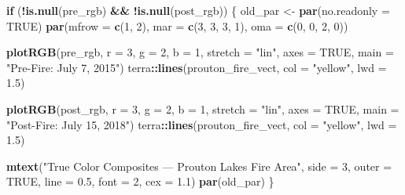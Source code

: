 \documentclass[
]{article}
\newenvironment{Shaded}{\begin{snugshade}}{\end{snugshade}}
\newcommand{\AttributeTok}[1]{\textcolor[rgb]{0.13,0.29,0.53}{#1}}
\newcommand{\ConstantTok}[1]{\textcolor[rgb]{0.56,0.35,0.01}{#1}}
\newcommand{\ControlFlowTok}[1]{\textcolor[rgb]{0.13,0.29,0.53}{\textbf{#1}}}
\newcommand{\DecValTok}[1]{\textcolor[rgb]{0.00,0.00,0.81}{#1}}
\newcommand{\FloatTok}[1]{\textcolor[rgb]{0.00,0.00,0.81}{#1}}
\newcommand{\FunctionTok}[1]{\textcolor[rgb]{0.13,0.29,0.53}{\textbf{#1}}}
\newcommand{\NormalTok}[1]{#1}
\newcommand{\OtherTok}[1]{\textcolor[rgb]{0.56,0.35,0.01}{#1}}
\newcommand{\SpecialCharTok}[1]{\textcolor[rgb]{0.81,0.36,0.00}{\textbf{#1}}}
\newcommand{\StringTok}[1]{\textcolor[rgb]{0.31,0.60,0.02}{#1}}
\begin{document}
\begin{Shaded}
\begin{Highlighting}[]
\ControlFlowTok{if}\NormalTok{ (}\SpecialCharTok{!}\FunctionTok{is.null}\NormalTok{(pre\_rgb) }\SpecialCharTok{\&\&} \SpecialCharTok{!}\FunctionTok{is.null}\NormalTok{(post\_rgb)) \{}
\NormalTok{  old\_par }\OtherTok{\textless{}{-}} \FunctionTok{par}\NormalTok{(}\AttributeTok{no.readonly =} \ConstantTok{TRUE}\NormalTok{)}
  \FunctionTok{par}\NormalTok{(}\AttributeTok{mfrow =} \FunctionTok{c}\NormalTok{(}\DecValTok{1}\NormalTok{, }\DecValTok{2}\NormalTok{), }\AttributeTok{mar =} \FunctionTok{c}\NormalTok{(}\DecValTok{3}\NormalTok{, }\DecValTok{3}\NormalTok{, }\DecValTok{3}\NormalTok{, }\DecValTok{1}\NormalTok{), }\AttributeTok{oma =} \FunctionTok{c}\NormalTok{(}\DecValTok{0}\NormalTok{, }\DecValTok{0}\NormalTok{, }\DecValTok{2}\NormalTok{, }\DecValTok{0}\NormalTok{))}

  \FunctionTok{plotRGB}\NormalTok{(pre\_rgb,  }\AttributeTok{r =} \DecValTok{3}\NormalTok{, }\AttributeTok{g =} \DecValTok{2}\NormalTok{, }\AttributeTok{b =} \DecValTok{1}\NormalTok{, }\AttributeTok{stretch =} \StringTok{"lin"}\NormalTok{, }\AttributeTok{axes =} \ConstantTok{TRUE}\NormalTok{,}
          \AttributeTok{main =} \StringTok{"Pre{-}Fire: July 7, 2015"}\NormalTok{)}
\NormalTok{  terra}\SpecialCharTok{::}\FunctionTok{lines}\NormalTok{(prouton\_fire\_vect, }\AttributeTok{col =} \StringTok{"yellow"}\NormalTok{, }\AttributeTok{lwd =} \FloatTok{1.5}\NormalTok{)}

  \FunctionTok{plotRGB}\NormalTok{(post\_rgb, }\AttributeTok{r =} \DecValTok{3}\NormalTok{, }\AttributeTok{g =} \DecValTok{2}\NormalTok{, }\AttributeTok{b =} \DecValTok{1}\NormalTok{, }\AttributeTok{stretch =} \StringTok{"lin"}\NormalTok{, }\AttributeTok{axes =} \ConstantTok{TRUE}\NormalTok{,}
          \AttributeTok{main =} \StringTok{"Post{-}Fire: July 15, 2018"}\NormalTok{)}
\NormalTok{  terra}\SpecialCharTok{::}\FunctionTok{lines}\NormalTok{(prouton\_fire\_vect, }\AttributeTok{col =} \StringTok{"yellow"}\NormalTok{, }\AttributeTok{lwd =} \FloatTok{1.5}\NormalTok{)}

  \FunctionTok{mtext}\NormalTok{(}\StringTok{"True Color Composites — Prouton Lakes Fire Area"}\NormalTok{,}
        \AttributeTok{side =} \DecValTok{3}\NormalTok{, }\AttributeTok{outer =} \ConstantTok{TRUE}\NormalTok{, }\AttributeTok{line =} \FloatTok{0.5}\NormalTok{, }\AttributeTok{font =} \DecValTok{2}\NormalTok{, }\AttributeTok{cex =} \FloatTok{1.1}\NormalTok{)}
  \FunctionTok{par}\NormalTok{(old\_par)}
\NormalTok{\}}
\end{Highlighting}
\end{Shaded}
\end{document}
